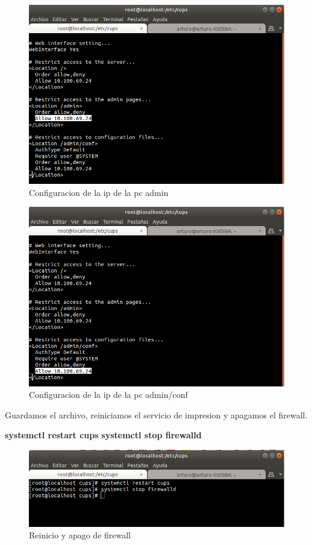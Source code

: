 \FloatBarrier
\begin{figure}[htbp!]
		\centering
			\includegraphics[width=.9\textwidth]{images/r6_2}
		\caption{Configuracion de la ip de la pc admin}
		\label{image:r6_2}
\end{figure}
\FloatBarrier

\FloatBarrier
\begin{figure}[htbp!]
		\centering
			\includegraphics[width=.9\textwidth]{images/r6_3}
		\caption{Configuracion de la ip de la pc admin/conf}
		\label{image:r6_3}
\end{figure}
\FloatBarrier
Guardamos el archivo,  reiniciamos el servicio de impresion y apagamos el firewall.
\\
\begin{center}
						\textbf{systemctl restart cups}
						\textbf{systemctl stop firewalld}
\end {center}
\FloatBarrier
\begin{figure}[htbp!]
		\centering
			\includegraphics[width=.9\textwidth]{images/r7}
		\caption{Reinicio y apago de firewall}
		\label{image:r7}
\end{figure}
\FloatBarrier

